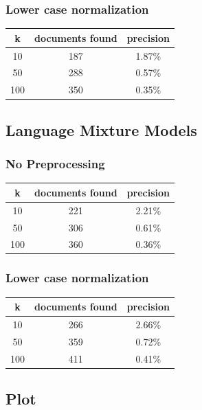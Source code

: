 \documentclass{article}
\begin{document}
\subsubsection{Lower case normalization}
\begin{center}
\begin{tabular}{|c|c|c|} \hline
\textbf{k} & \textbf{documents found} & \textbf{precision}\\ \hline
10 & 187 & 1.87\%\\
50 & 288 & 0.57\%\\
100 & 350 & 0.35\%\\ \hline

\end{tabular}
\end{center}

\subsection{Language Mixture Models}
\subsubsection{No Preprocessing}
\begin{center}
\begin{tabular}{|c|c|c|} \hline
\textbf{k} & \textbf{documents found} & \textbf{precision}\\ \hline
10 & 221 & 2.21\%\\
50 & 306 & 0.61\%\\
100 & 360 & 0.36\%\\ \hline

\end{tabular}
\end{center}

\subsubsection{Lower case normalization}
\begin{center}
\begin{tabular}{|c|c|c|} \hline
\textbf{k} & \textbf{documents found} & \textbf{precision}\\ \hline
10 & 266 & 2.66\%\\
50 & 359 & 0.72\%\\
100 & 411 & 0.41\%\\ \hline
\end{tabular}
\end{center}

\subsection{Plot}
\end{document}

